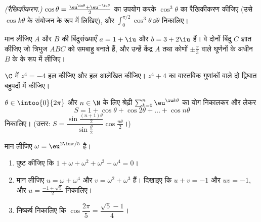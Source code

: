 \begin{exercise}[$\star\star$]\label{exo:g12:complex:6}
\emph{(रैखिकीकरण.)} $\cos\theta = \frac{\eu^{\iu\theta} + \eu^{-\iu\theta}}{2}$ का उपयोग करके $\cos^3\theta$ का रैखिकीकरण कीजिए (उसे $\cos k\theta$
के संयोजन के रूप में लिखिए), और $\displaystyle\int_0^{\pi/2}\cos^3\theta\,\dd\theta$ निकालिए।
\end{exercise}

\begin{exercise}[$\star\star$]\label{exo:g12:complex:7}
मान लीजिए $A$ और $B$ की बिंदुसंख्याएँ $a = 1 + \iu$ और $b = 3 + 2\iu$ हैं। वे दोनों बिंदु
$C$ ज्ञात कीजिए जो त्रिभुज $ABC$ को समबाहु बनाते हैं, और उन्हें केंद्र $A$
तथा कोणों $\pm\frac{\pi}{3}$ वाले घूर्णनों के अधीन $B$ के  के रूप में लीजिए।
\end{exercise}

\begin{exercise}[$\star\star\star$]\label{exo:g12:complex:8}
$\C$ में $z^4 = -4$ हल कीजिए और हल आलेखित कीजिए। $z^4 + 4$ का वास्तविक गुणांकों वाले
दो द्विघात बहुपदों में  कीजिए।
\end{exercise}

\begin{exercise}[$\star\star\star$]\label{exo:g12:complex:9}
$\theta \in \intoo{0}{2\pi}$ और $n \in \N$ के लिए  श्रेढ़ी $\sum_{k=0}^n \eu^{\iu k\theta}$ का योग निकालकर और 
लेकर
\[
S = 1 + \cos\theta + \cos 2\theta + \dots + \cos n\theta
\]
निकालिए। (उत्तर: $S = \dfrac{\sin\frac{(n+1)\theta}{2}}{\sin\frac{\theta}{2}}
\cos\frac{n\theta}{2}$।)
\end{exercise}

\begin{exercise}[$\star\star\star$]\label{exo:g12:complex:10}
मान लीजिए $\omega = \eu^{2\iu\pi/5}$ है।
\begin{enumerate}
  \item पुष्ट कीजिए कि $1 + \omega + \omega^2 + \omega^3 + \omega^4 = 0$।
  \item मान लीजिए $u = \omega + \omega^4$ और $v = \omega^2 + \omega^3$ हैं। दिखाइए कि $u + v = -1$ और $uv = -1$, और $u = \frac{-1+\sqrt5}{2}$
        निकालिए।
  \item निष्कर्ष निकालिए कि $\cos\dfrac{2\pi}{5} = \dfrac{\sqrt5 - 1}{4}$।
\end{enumerate}
\end{exercise}

